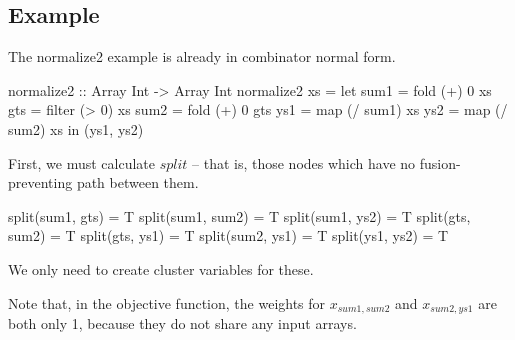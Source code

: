 \subsection{Example}
The normalize2 example is already in combinator normal form.
\begin{code}
 normalize2 :: Array Int -> Array Int
 normalize2 xs
  = let sum1 = fold   (+)  0   xs
        gts  = filter (> 0)    xs
        sum2 = fold   (+)  0   gts
        ys1  = map    (/ sum1) xs
        ys2  = map    (/ sum2) xs
    in (ys1, ys2)
\end{code}

First, we must calculate $split$ -- that is, those nodes which have no fusion-preventing path between them.
\begin{code}
split(sum1, gts)    = T
split(sum1, sum2)   = T
split(sum1, ys2)    = T
split(gts,  sum2)   = T
split(gts,  ys1)    = T
split(sum2, ys1)    = T
split(ys1,  ys2)    = T
\end{code}
We only need to create cluster variables for these.

Note that, in the objective function, the weights for $x_{sum1, sum2}$ and $x_{sum2, ys1}$ are both only 1, because they do not share any input arrays.

